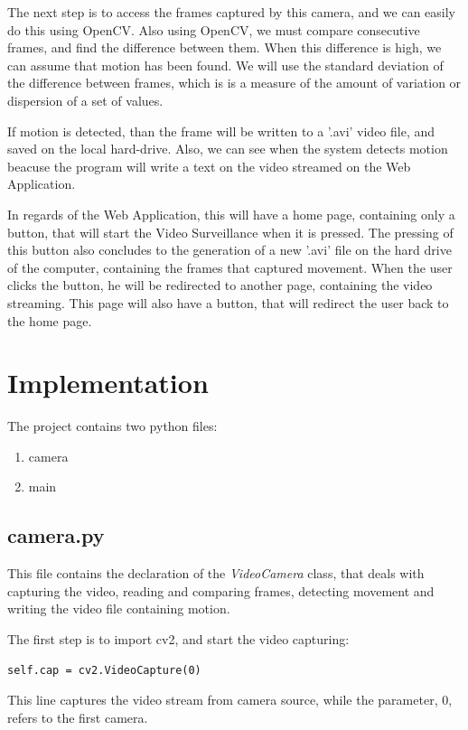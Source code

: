 \documentclass[a4paper,12pt]{report}
\begin{document}
The next step is to access the frames captured by this camera, and we can easily do this using OpenCV. Also using OpenCV, we must compare consecutive frames, and find the difference between them. When this difference is high, we can assume that motion has been found. We will use the standard deviation of the difference between frames, which is is a measure of the amount of variation or dispersion of a set of values.

If motion is detected, than the frame will be written to a '.avi' video file, and saved on the local hard-drive. Also, we can see when the system detects motion beacuse the program will write a text on the video streamed on the Web Application.

In regards of the Web Application, this will have a home page, containing only a button, that will start the Video Surveillance when it is pressed. The pressing of this button also concludes to the generation of a new '.avi' file on the hard drive of the computer, containing the frames that captured movement. When the user clicks the button, he will be redirected to another page, containing the video streaming. This page will also have a button, that will redirect the user back to the home page.


\chapter{Implementation}

The project contains two python files:
\begin{enumerate}
\item camera
\item main
\end{enumerate}

\section{camera.py}

This file contains the declaration of the \textit{VideoCamera} class, that deals with capturing the video, reading and comparing frames, detecting movement and writing the video file containing motion.

The first step is to import cv2, and start the video capturing:

\begin{Verbatim}[frame=single]
    self.cap = cv2.VideoCapture(0)
\end{Verbatim}

This line captures the video stream from camera source, while the parameter, 0, refers to the first camera.
\end{document}
